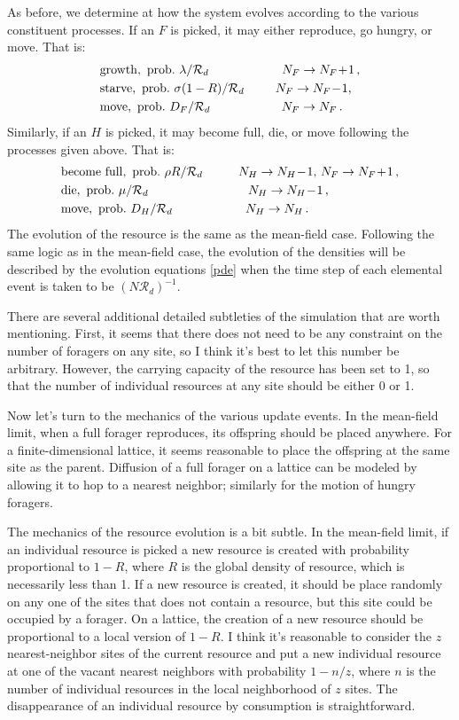 \documentclass[11pt]{iopart}
\begin{document}
As before, we determine at how the system evolves according to the various
constituent processes.  If an $F$ is picked, it may either reproduce, go
hungry, or move.  That is:
\begin{align*}
&\mathrm{growth,~ prob.\ } \lambda/\mathcal{R}_d\hskip 0.82 in N_F\to N_F\!+\!1\,,\\
&\mathrm{starve,~ prob.\ } \sigma(1-R)/\mathcal{R}_d \hskip 0.35 in N_F\to N_F\!-\!1,\,\\
&\mathrm{move,~ prob.\ } D_F/\mathcal{R}_d \hskip 0.8 in N_F\to N_F\,.
\end{align*}
Similarly, if an $H$ is picked, it may become full, die, or move following
the processes given above.  That is:
\begin{align*}
&\mathrm{become\ full,~  prob.\ } \rho R/\mathcal{R}_d\hskip 0.4in N_H\to N_H\!-\!1,\,
  N_F\to N_F\!+\!1\,,\\
&\mathrm{die,~ prob.\ } \mu/\mathcal{R}_d\hskip 1.12 in N_H\to N_H\!-\!1\,,\\
&\mathrm{move,~ prob.\ } D_H/\mathcal{R}_d\hskip 0.82 in N_H\to N_H\,.
\end{align*}
The evolution of the resource is the same as the mean-field case.  Following
the same logic as in the mean-field case, the evolution of the densities will
be described by the evolution equations \eqref{pde} when the time step of
each elemental event is taken to be $(N\mathcal{R}_d)^{-1}$.

There are several additional detailed subtleties of the simulation that are
worth mentioning.  First, it seems that there does not need to be any
constraint on the number of foragers on any site, so I think it's best to let
this number be arbitrary.  However, the carrying capacity of the resource has
been set to 1, so that the number of individual resources at any site should
be either 0 or 1.

Now let's turn to the mechanics of the various update events.  In the
mean-field limit, when a full forager reproduces, its offspring should be
placed anywhere.  For a finite-dimensional lattice, it seems reasonable to
place the offspring at the same site as the parent.  Diffusion of a full
forager on a lattice can be modeled by allowing it to hop to a nearest
neighbor; similarly for the motion of hungry foragers.

The mechanics of the resource evolution is a bit subtle.  In the mean-field
limit, if an individual resource is picked a new resource is created with
probability proportional to $1-R$, where $R$ is the global density of
resource, which is necessarily less than 1.  If a new resource is created, it
should be place randomly on any one of the sites that does not contain a
resource, but this site could be occupied by a forager.  On a lattice, the
creation of a new resource should be proportional to a local version of
$1-R$.  I think it's reasonable to consider the $z$ nearest-neighbor sites of
the current resource and put a new individual resource at one of the vacant
nearest neighbors with probability $1-{n}/{z}$, where $n$ is the number
of individual resources in the local neighborhood of $z$ sites.  The
disappearance of an individual resource by consumption is straightforward.
\end{document}
